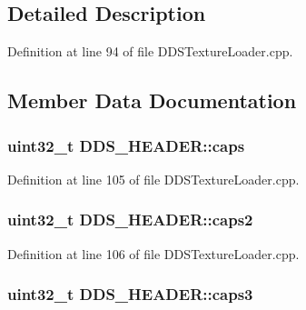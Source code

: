 \subsection{Detailed Description}


Definition at line 94 of file D\+D\+S\+Texture\+Loader.\+cpp.



\subsection{Member Data Documentation}
\subsubsection[{\texorpdfstring{caps}{caps}}]{\setlength{\rightskip}{0pt plus 5cm}uint32\+\_\+t D\+D\+S\+\_\+\+H\+E\+A\+D\+E\+R\+::caps}\hypertarget{struct_d_d_s___h_e_a_d_e_r_abe6a0e77831687e848375587e992046a_abe6a0e77831687e848375587e992046a}{}\label{struct_d_d_s___h_e_a_d_e_r_abe6a0e77831687e848375587e992046a_abe6a0e77831687e848375587e992046a}


Definition at line 105 of file D\+D\+S\+Texture\+Loader.\+cpp.

\subsubsection[{\texorpdfstring{caps2}{caps2}}]{\setlength{\rightskip}{0pt plus 5cm}uint32\+\_\+t D\+D\+S\+\_\+\+H\+E\+A\+D\+E\+R\+::caps2}\hypertarget{struct_d_d_s___h_e_a_d_e_r_aaeb2d711eeae0d04523ef4786a1120fa_aaeb2d711eeae0d04523ef4786a1120fa}{}\label{struct_d_d_s___h_e_a_d_e_r_aaeb2d711eeae0d04523ef4786a1120fa_aaeb2d711eeae0d04523ef4786a1120fa}


Definition at line 106 of file D\+D\+S\+Texture\+Loader.\+cpp.

\subsubsection[{\texorpdfstring{caps3}{caps3}}]{\setlength{\rightskip}{0pt plus 5cm}uint32\+\_\+t D\+D\+S\+\_\+\+H\+E\+A\+D\+E\+R\+::caps3}\hypertarget{struct_d_d_s___h_e_a_d_e_r_a922da2c168f35e78ba99fe7d4350b422_a922da2c168f35e78ba99fe7d4350b422}{}\label{struct_d_d_s___h_e_a_d_e_r_a922da2c168f35e78ba99fe7d4350b422_a922da2c168f35e78ba99fe7d4350b422}


